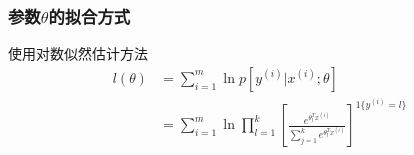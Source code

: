 \subsubsection{参数$\theta$的拟合方式}
使用对数似然估计方法
\begin{align}
	l(\theta) &= \sum_{i=1}^{m}\ln p\left[y^{(i)}|x^{(i)};\theta\right] \\
	&= \sum_{i=1}^{m} \ln \prod_{l=1}^{k}\left[
	\frac{e^{\theta_l^Tx^{(i)}}}{\sum_{j=1}^{k}e^{\theta_l^Tx^{(i)}}}
	\right]^{1\{y^{(i)}=l\}}
\end{align}
{\color{red}{后续待补充}}











